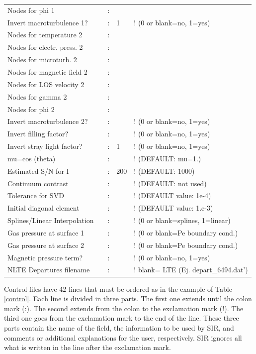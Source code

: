 \begin{table}
\begin{tabular}{lrcll}
Nodes for phi 1            &  &:&     &          \\
Invert macroturbulence 1?  &  &:&1    &        ! (0 or blank=no, 1=yes)\\
Nodes for temperature 2    &  &:&     &          \\
Nodes for electr. press. 2 &  &:&     &                \\
Nodes for microturb. 2     &  &:&     &              \\
Nodes for magnetic field 2 &  &:&     &\\
Nodes for LOS velocity 2   &  &:&     &         \\
Nodes for gamma 2          &  &:&     &          \\
Nodes for phi 2            &  &:&     &          \\
Invert macroturbulence 2?  &  &:&     &        ! (0 or blank=no, 1=yes)\\
Invert filling factor?     &  &:&     &        ! (0 or blank=no, 1=yes)\\
Invert stray light factor? &  &:&1    &        ! (0 or blank=no, 1=yes)\\
mu=cos (theta)              & &:&     &        ! (DEFAULT: mu=1.)\\
Estimated S/N for I         & &:&200  &        ! (DEFAULT: 1000) \\
Continuum contrast          & &:&     &        ! (DEFAULT: not used)\\
Tolerance for SVD           & &:&     &        ! (DEFAULT value: 1e-4)\\
Initial diagonal element    & &:&     &        ! (DEFAULT value: 1.e-3) \\
Splines/Linear Interpolation& &:&     &        ! (0 or blank=splines, 1=linear) \\
Gas pressure at surface 1   & &:&     &        ! (0 or blank=Pe boundary cond.) \\
Gas pressure at surface 2   & &:&     &        ! (0 or blank=Pe boundary cond.) \\
Magnetic pressure term?     & &:&     &        ! (0 or blank=no, 1=yes) \\
NLTE Departures filename    & &:&     &        ! blank= LTE (Ej. depart\_6494.dat') \\
\end{tabular}
\end{table}

Control files have 42 lines that must be ordered as in the example of
Table \ref{control}. Each line is divided in three parts. The first one
extends until the colon mark (:). The second extends from the colon to
the exclamation mark (!). The third one goes from the exclamation mark
to the end of the line. These three parts contain the name of the field, the
information to be used by SIR, and comments or additional explanations
for the user, respectively. SIR ignores all what is written in the line 
after the exclamation mark.

